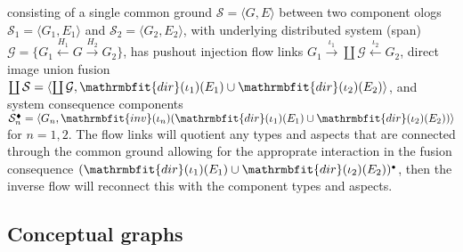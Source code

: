 \documentclass{amsart}
\theoremstyle{remark}
\theoremstyle{definition}
\begin{document}
\begin{itemize}
consisting of a single common ground $\mathcal{S}={\langle{G,E}\rangle}$
between two component ologs 
$\mathcal{S}_{1}={\langle{G_{1},E_{1}}\rangle}$ and
$\mathcal{S}_{2}={\langle{G_{2},E_{2}}\rangle}$,
with underlying distributed system (span)
$\mathcal{G} = \{ G_{1} \xleftarrow{H_{1}} G \xrightarrow{H_{2}} G_{2} \}$, 
has pushout injection flow links
$G_{1} \xrightarrow{\iota_{1}} \coprod\mathcal{G} \xleftarrow{\iota_{2}} G_{2}$,
direct image union fusion
$\coprod\mathcal{S}
= {\langle{\coprod\mathcal{G},\mathrmbfit{dir}(\iota_{1})(E_{1})\cup\mathrmbfit{dir}(\iota_{2})(E_{2})}\rangle}$,
and system consequence components 
$\mathcal{S}^{\scriptscriptstyle\blacklozenge}_{n} 
= {\langle{G_{n},
\mathrmbfit{inv}(\iota_{n})(\mathrmbfit{dir}(\iota_{1})(E_{1})\cup\mathrmbfit{dir}(\iota_{2})(E_{2}))}\rangle}$ 
for $n = 1,2$.
The flow links will quotient any types and aspects that are connected through the common ground
allowing for the approprate interaction in the fusion consequence
$(\mathrmbfit{dir}(\iota_{1})(E_{1})\cup\mathrmbfit{dir}(\iota_{2})(E_{2}))^{\scriptscriptstyle\bullet}$,
then the inverse flow will reconnect this with the component types and aspects.
%
\end{itemize}


\subsection{Conceptual graphs}\label{sec:CG}
\end{document}
